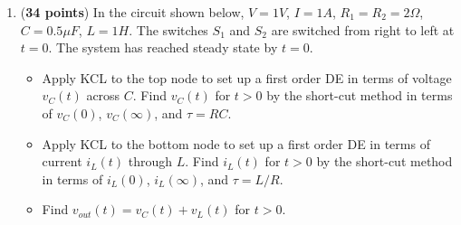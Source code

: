 \begin{enumerate}
\begin{comment}
  {\bf Solution:}  $\dot{V}_C=10\angle 0$
  \[ 
  \dot{I}_R=\frac{\dot{V}_C}{R}=\frac{10}{5}=2,\;\;\;\;\;
  i_R(t)=2\sqrt{2}\cos(1000t)
  \]

  \[ 
  \dot{I}_C=\frac{\dot{V}_C}{Z_C}=10\items(j1000\times 250\times 10^{-6})
  =j2.5,  \;\;\;\;\;
  i_C(t)=2.5\sqrt{2}\cos(1000t+\pi/2)
  \]
  
  \[
  \dot{I}=\dot{I}_R+\dot{I}_C=2+j2.5=3.2\angle 0.896,\;\;\;\;
  i(t)=3.2\sqrt{2}\cos(1000 t+0.896)  
  \]
  
  \[
  \dot{V}_L=\dot{I}\times j\omega L
  =3.2\angle 0.896 \times (j1000\times 3\times 10^{-3})
  =9.6\angle 2.47,\;\;\;\;
  v_L(t)=9.6\sqrt{2}\cos(1000t+2.47)
  \]
  \[ 
  \dot{V}_S=\dot{V}_L+\dot{V}_C=9.6\angle 2.47+10\angle 0
  =6.5\angle 1.177,\;\;\;\;\;
  v_s(t)=6.5\sqrt{2}\cos(1000t+1.177)
  \]
  \end{comment}
  
\item ({\bf 34 points}) 
  In the circuit shown below, $V=1V$, $I=1A$, $R_1=R_2=2\Omega$,
  $C=0.5\mu F$, $L=1H$. The switches $S_1$ and $S_2$ are switched from 
  right to left at $t=0$. The system has reached steady state by $t=0$.


  \begin{itemize}
  \item Apply KCL to the top node to set up a first order DE in terms
    of voltage $v_C(t)$ across $C$. Find $v_C(t)$ for $t>0$ by the short-cut
    method in terms of $v_C(0)$, $v_C(\infty)$, and $\tau=RC$.
  \item Apply KCL to the bottom node to set up a first order DE in terms
    of current $i_L(t)$ through $L$. Find $i_L(t)$ for $t>0$ by the short-cut
    method in terms of $i_L(0)$, $i_L(\infty)$, and $\tau=L/R$.
  \item 
    Find $v_{out}(t)=v_C(t)+v_L(t)$ for $t>0$.
  \end{itemize}

  \begin{comment}

  {\bf Solution:} 
  \begin{itemize}
  \item 
    \[ 
    C\frac{dv_C(t)}{dt}+\frac{v_C(t)}{2}=2,\;\;\;\;\;\;
    \frac{L}{2}\frac{di_L(t)}{dt}+i_L(t)=2
    \]
  \item $V_C(0)=1V$, $V_C(\infty)=4V$, $\tau_C=RC=2\times 0.5=1\;sec.$
    \[ 
    v_C(t)=v_C(\infty)+[v_C(0)-v_C(\infty)]e^{-t/\tau}=4+(1-4)e^{-t}
    \]
  \item $i_L(0)=1A$, $i_L(\infty)=2A$, $\tau_C=L/R=1/2=0.5\;sec.$
    \[ 
    i_L(t)=i_L(\infty)+[i_L(0)-i_L(\infty)]e^{-t/\tau}=2+(1-2)e^{-2t}=2-e^{-2t}
    \]
    \[
    v_L(t)=L\frac{di_L(t)}{dt}=2e^{-2t}
    \]
  \item
    \[
    v_{out}(t)=v_C(t)+v_L(t)=4-3e^{-t}+2e^{-2t}
    \]
  \end{itemize}
  \end{comment}

\end{enumerate}

